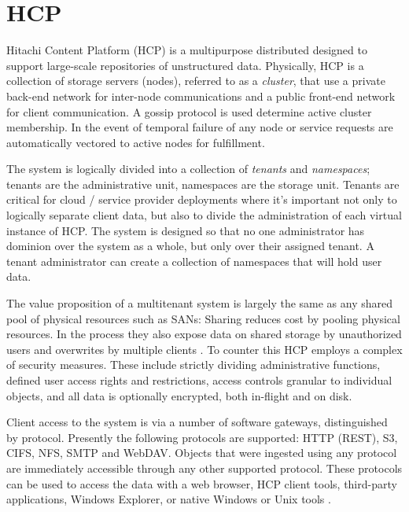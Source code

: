 
\section{HCP} \label{s:hcp}
Hitachi Content Platform (HCP) is a multipurpose distributed \os{} designed to support large-scale repositories of unstructured data. Physically, HCP is a collection of storage servers (nodes), referred to as a \emph{cluster}, that use a private back-end network for inter-node communications and a public front-end network for client communication. A gossip protocol is used determine active cluster membership. In the event of temporal failure of any node or service requests are automatically vectored to active nodes for fulfillment.

The system is logically divided into a collection of \emph{tenants} and \emph{namespaces}; tenants are the administrative unit, namespaces are the storage unit. Tenants are critical for cloud / service provider deployments where it's important not only to logically separate client data, but also to divide the administration of each virtual instance of HCP. The system is designed so that no one administrator has dominion over the system as a whole, but only over their assigned tenant. A tenant administrator can create a collection of namespaces that will hold user data.

The value proposition of a multitenant system is largely the same as any shared pool of physical resources such as SANs: Sharing reduces cost by pooling physical resources. In the process they also expose data on shared storage by unauthorized users and overwrites by multiple clients \cite{yoshida1999lun}. To counter this HCP employs a complex of security measures. These include strictly dividing administrative functions, defined user access rights and restrictions, access controls granular to individual objects, and all data is optionally encrypted, both in-flight and on disk.

Client access to the system is via a number of software gateways, distinguished by protocol. Presently the following protocols are supported: HTTP (REST), S3, CIFS, NFS, SMTP and WebDAV. Objects that were ingested using any protocol are immediately accessible through any other supported protocol. These protocols can be used to access the data with a web browser, HCP client tools, third-party applications, Windows Explorer, or native Windows or Unix tools \cite{MR:2013:HCP-ARCH}.

